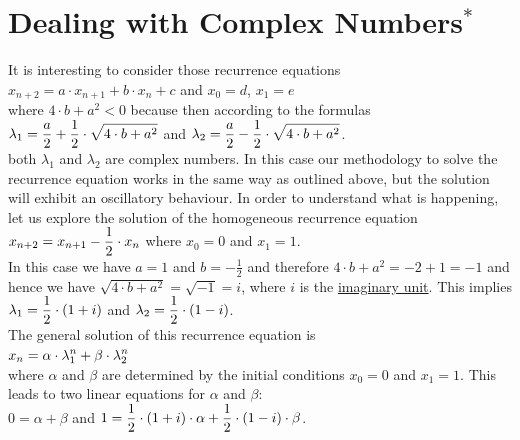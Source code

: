\section{Dealing with Complex Numbers$^*$}
It is interesting to consider those recurrence equations 
\\[0.2cm]
\hspace*{1.3cm}
$x_{n+2} = a \cdot x_{n+1} + b \cdot x_n + c$ \quad and \quad $x_0 = d$, $x_1 = e$
\\[0.2cm]
where $4 \cdot b + a^2 < 0$ because then according to the formulas
\\[0.2cm]
\hspace*{1.3cm}
$\displaystyle\lambda_1 = \frac{a}{2} + \frac{1}{2} \cdot \sqrt{4 \cdot b + a^2}$ \quad and \quad
$\displaystyle\lambda_2 = \frac{a}{2} - \frac{1}{2} \cdot \sqrt{4 \cdot b + a^2}$.
\\[0.2cm]
both $\lambda_1$ and $\lambda_2$ are complex numbers.  In this case our methodology to solve the
recurrence equation works in the same way as outlined above, but the solution will exhibit an oscillatory
behaviour.  In order to understand what is happening, let us explore the solution of the homogeneous recurrence
equation 
\\[0.2cm]
\hspace*{1.3cm}
$\displaystyle x_{n+2} = x_{n+1} - \frac{1}{2} \cdot x_n$ \quad where $x_0 = 0$ and $x_1 = 1$.
\\[0.2cm]
In this case we have $a = 1$ and $b = -\frac{1}{2}$ and therefore $4 \cdot b + a^2 = -2 + 1 = -1$ and hence we
have $\sqrt{4 \cdot b + a^2} = \sqrt{-1} = i$, where $i$ is the
\href{https://en.wikipedia.org/wiki/Imaginary_unit}{imaginary unit}.  
This implies
\\[0.2cm]
\hspace*{1.3cm}
$\displaystyle\lambda_1 = \frac{1}{2} \cdot (1 + i)$ \quad and \quad $\displaystyle\lambda_2 = \frac{1}{2} \cdot (1 - i)$.
\\[0.2cm]
The general solution of this recurrence equation is
\\[0.2cm]
\hspace*{1.3cm}
$\displaystyle x_n = \alpha \cdot \lambda_1^n + \beta \cdot \lambda_2^n$
\\[0.2cm]
where $\alpha$ and $\beta$ are determined by the initial conditions $x_0 = 0$ and $x_1 = 1$.
This leads to two linear equations for $\alpha$ and $\beta$:
\\[0.2cm]
\hspace*{1.3cm}
$0 = \alpha + \beta$ \quad and \quad
$\displaystyle 1 = \frac{1}{2} \cdot (1 + i) \cdot \alpha + \frac{1}{2} \cdot (1 - i) \cdot \beta$.
